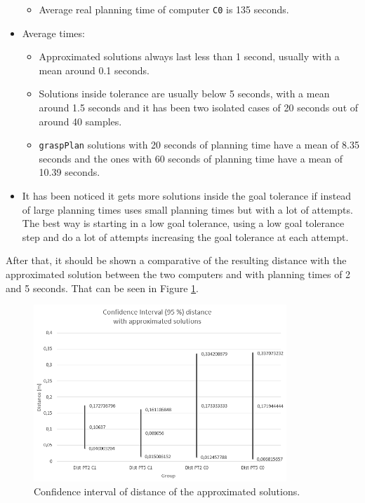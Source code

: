 \documentclass[12pt,a4paper,final,twoside,openright]{report}
\begin{document}
\begin{itemize}
\begin{itemize}
\item Average real planning time of computer \texttt{C0} is 135 seconds.
\end{itemize}
\item Average times:
\begin{itemize}
\item Approximated solutions always last less than 1 second, usually with a mean around 0.1 seconds.
\item Solutions inside tolerance are usually below 5 seconds, with a mean around 1.5 seconds and it has been two isolated cases of 20 seconds out of around 40 samples.
\item \texttt{graspPlan} solutions with 20 seconds of planning time have a mean of 8.35 seconds and the ones with 60 seconds of planning time have a mean of 10.39 seconds.
\end{itemize}
\item It has been noticed it gets more solutions inside the goal tolerance if instead of large planning times uses small planning times but with a lot of attempts. The best way is starting in a low goal tolerance, using a low goal tolerance step and do a lot of attempts increasing the goal tolerance at each attempt.
\end{itemize}

After that, it should be shown a comparative of the resulting distance with the approximated solution between the two computers and with planning times of 2 and 5 seconds. That can be seen in Figure \ref{fig:exp_conf_int_dist_approx}.

\begin{figure}[!h]
\centering
\includegraphics[width=0.85\textwidth]{images/dist_approx_sol_graph.png}
\caption{Confidence interval of distance of the approximated solutions.\label{fig:exp_conf_int_dist_approx}}
\end{figure}
\end{document}
